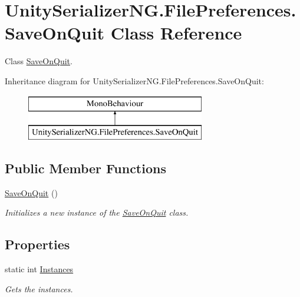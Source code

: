 \hypertarget{class_unity_serializer_n_g_1_1_file_preferences_1_1_save_on_quit}{}\section{Unity\+Serializer\+N\+G.\+File\+Preferences.\+Save\+On\+Quit Class Reference}
\label{class_unity_serializer_n_g_1_1_file_preferences_1_1_save_on_quit}


Class \hyperlink{class_unity_serializer_n_g_1_1_file_preferences_1_1_save_on_quit}{Save\+On\+Quit}.  


Inheritance diagram for Unity\+Serializer\+N\+G.\+File\+Preferences.\+Save\+On\+Quit\+:\begin{figure}[H]
\begin{center}
\leavevmode
\includegraphics[height=2.000000cm]{class_unity_serializer_n_g_1_1_file_preferences_1_1_save_on_quit}
\end{center}
\end{figure}
\subsection*{Public Member Functions}
\begin{DoxyCompactItemize}
\item 
\hyperlink{class_unity_serializer_n_g_1_1_file_preferences_1_1_save_on_quit_ab43cb0bd9b353d4bbb2c19f17310f605}{Save\+On\+Quit} ()
\begin{DoxyCompactList}\small\item\em Initializes a new instance of the \hyperlink{class_unity_serializer_n_g_1_1_file_preferences_1_1_save_on_quit}{Save\+On\+Quit} class. \end{DoxyCompactList}\end{DoxyCompactItemize}
\subsection*{Properties}
\begin{DoxyCompactItemize}
\item 
static int \hyperlink{class_unity_serializer_n_g_1_1_file_preferences_1_1_save_on_quit_a9cc9017491fa2c84553ac9f4cbaa39a7}{Instances}
\begin{DoxyCompactList}\small\item\em Gets the instances. \end{DoxyCompactList}\end{DoxyCompactItemize}


